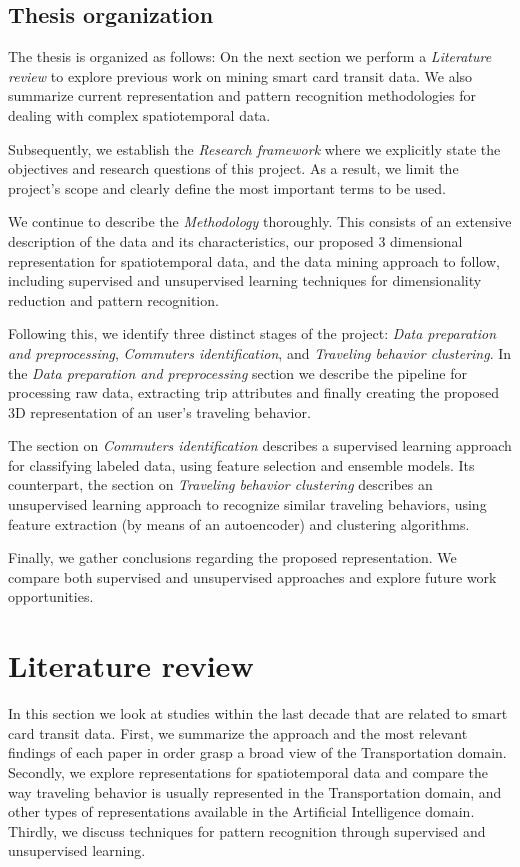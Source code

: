 \documentclass{article}
\begin{document}
\subsection{Thesis organization}
The thesis is organized as follows: On the next section we perform a \textit{Literature review} to explore previous work on mining smart card transit data. We also summarize current representation and pattern recognition methodologies for dealing with complex spatiotemporal data.  

Subsequently, we establish the \textit{Research framework} where we explicitly state the objectives and research questions of this project. As a result, we limit the project's scope and clearly define the most important terms to be used. 

We continue to describe the \textit{Methodology} thoroughly. This consists of an extensive description of the data and its characteristics, our proposed 3 dimensional representation for spatiotemporal data, and the data mining approach to follow, including supervised and unsupervised learning techniques for dimensionality reduction and pattern recognition.

Following this, we identify three distinct stages of the project: \textit{Data preparation and preprocessing}, \textit{Commuters identification}, and \textit{Traveling behavior clustering}. In the \textit{Data preparation and preprocessing} section we describe the pipeline for processing raw data, extracting trip attributes and finally creating the proposed 3D representation of an user's traveling behavior. 

The section on \textit{Commuters identification} describes a supervised learning approach for classifying labeled data, using feature selection and ensemble models. Its counterpart, the section on \textit{Traveling behavior clustering} describes an unsupervised  learning approach to recognize similar traveling behaviors, using feature extraction (by means of an autoencoder) and clustering algorithms. 

Finally, we gather conclusions regarding the proposed representation. We compare both supervised and unsupervised approaches and explore future work opportunities. 

\newpage
\section{Literature review}
In this section we look at studies within the last decade that are related to smart card transit data. First, we summarize the approach and the most relevant findings of each paper in order grasp a broad view of the Transportation domain. Secondly, we explore representations for spatiotemporal data and compare the way traveling behavior is usually represented in the Transportation domain, and other types of representations available in the Artificial Intelligence domain. Thirdly, we discuss techniques for pattern recognition through supervised and unsupervised learning. %
\end{document}
